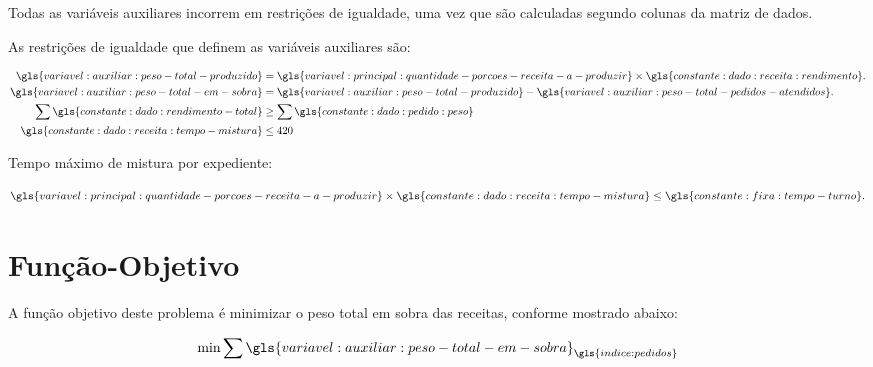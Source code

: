 Todas as variáveis auxiliares incorrem em restrições de igualdade, uma vez que são calculadas segundo colunas da matriz de dados.

As restrições de igualdade que definem as variáveis auxiliares são:

\begin{align}
    \gls{variavel:auxiliar:peso-total-produzido} &
    = \gls{variavel:principal:quantidade-porcoes-receita-a-produzir} \times \gls{constante:dado:receita:rendimento}.
    \\
    \gls{variavel:auxiliar:peso-total-em-sobra}  &
    = \gls{variavel:auxiliar:peso-total-produzido} - \gls{variavel:auxiliar:peso-total-pedidos-atendidos}.
    \\
    \sum \gls{constante:dado:rendimento-total}   &
    \geq
    \sum \gls{constante:dado:pedido:peso}
    \\
    \gls{constante:dado:receita:tempo-mistura}   &
    \leq 420
\end{align}

Tempo máximo de mistura por expediente:

\begin{align}
    \gls{variavel:principal:quantidade-porcoes-receita-a-produzir}
    \times \gls{constante:dado:receita:tempo-mistura}
    \leq \gls{constante:fixa:tempo-turno}.
\end{align}

\section{Função-Objetivo}

A função objetivo deste problema é minimizar o peso total em sobra das receitas, conforme mostrado abaixo:

\begin{align}
    \min \sum \gls{variavel:auxiliar:peso-total-em-sobra}_{\gls{indice:pedidos}}
\end{align}
